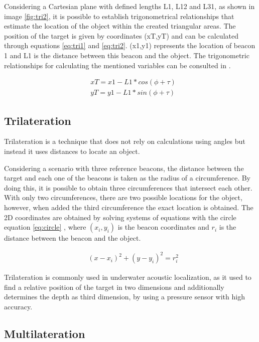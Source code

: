 Considering a Cartesian plane with defined lengths L1, L12 and L31, as shown in image \ref{fig:tri2}, it is possible to establish trigonometrical relationships that estimate the location of the object within the created triangular areas. The position of the target is given by coordinates (xT,yT) and can be calculated through equations \ref{eq:tri1} and \ref{eq:tri2}. (x1,y1) represents the location of beacon 1 and L1 is the distance between this beacon and the object. The trigonometric relationships for calculating the mentioned variables can be consulted in \cite{triangalgo}.

\begin{eqnarray}
& xT = x1 - L1 * cos(\phi + \tau)
\label{eq:tri1}\\
& yT = y1 - L1 * sin(\phi + \tau)
\label{eq:tri2}
\end{eqnarray}

\subsection{Trilateration}

Trilateration is a technique that does not rely on calculations using angles but instead it uses distances to locate an object.

Considering a scenario with three reference beacons, the distance between the target and each one of the beacons is taken as the radius of a circumference. By doing this, it is possible to obtain three circumferences that intersect each other. With only two circumferences, there are two possible locations for the object, however, when added the third circumference the exact location is obtained. The 2D coordinates are obtained by solving systems of equations with the circle equation \ref{eq:circle} \cite{trilat}, where $(x_{i}, y_{i})$ is the beacon coordinates and $r_{i}$ is the distance between the beacon and the object.

\begin{eqnarray}
& (x - x_{i})^2 + (y - y_{i})^2 = r_{i}^2 
\label{eq:circle}
\end{eqnarray}

Trilateration is commonly used in underwater acoustic localization, as it used to find a relative position of the target in two dimensions and additionally determines the depth as third dimension, by using a pressure sensor with high accuracy.

\subsection{Multilateration} \label{subsec:multilateration}


